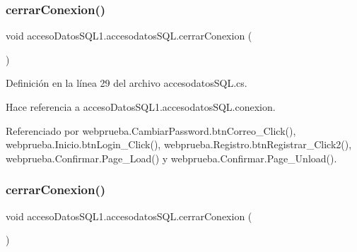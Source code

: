 \subsubsection{\texorpdfstring{cerrarConexion()}{cerrarConexion()}\hspace{0.1cm}{\footnotesize\ttfamily [1/2]}}
{\footnotesize\ttfamily void acceso\+Datos\+S\+Q\+L1.\+accesodatos\+S\+Q\+L.\+cerrar\+Conexion (\begin{DoxyParamCaption}{ }\end{DoxyParamCaption})}



Definición en la línea 29 del archivo accesodatos\+S\+Q\+L.\+cs.


\begin{DoxyCode}{0}

\end{DoxyCode}


Hace referencia a acceso\+Datos\+S\+Q\+L1.\+accesodatos\+S\+Q\+L.\+conexion.



Referenciado por webprueba.\+Cambiar\+Password.\+btn\+Correo\+\_\+\+Click(), webprueba.\+Inicio.\+btn\+Login\+\_\+\+Click(), webprueba.\+Registro.\+btn\+Registrar\+\_\+\+Click2(), webprueba.\+Confirmar.\+Page\+\_\+\+Load() y webprueba.\+Confirmar.\+Page\+\_\+\+Unload().

\mbox{\label{classacceso_datos_s_q_l1_1_1accesodatos_s_q_l_ad3ba7760f992cfc9277b05093b661115}} 
\subsubsection{\texorpdfstring{cerrarConexion()}{cerrarConexion()}\hspace{0.1cm}{\footnotesize\ttfamily [2/2]}}
{\footnotesize\ttfamily void acceso\+Datos\+S\+Q\+L1.\+accesodatos\+S\+Q\+L.\+cerrar\+Conexion (\begin{DoxyParamCaption}{ }\end{DoxyParamCaption})}



